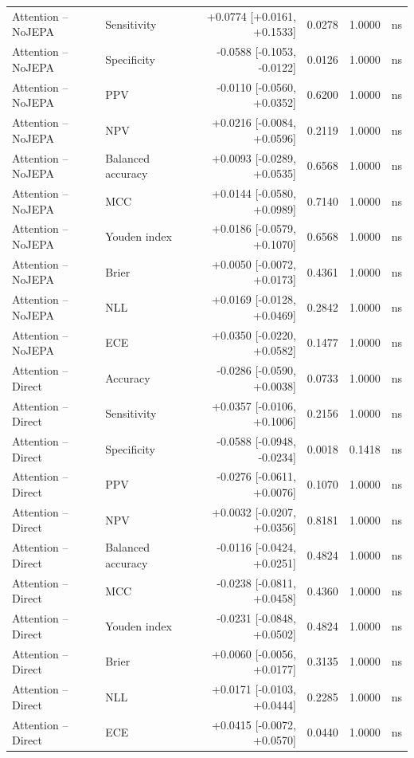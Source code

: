 \begin{table}[t]
\begin{tabular}{llrrrc}
Attention -- NoJEPA & Sensitivity & +0.0774 [+0.0161, +0.1533] & 0.0278 & 1.0000 & ns \\
Attention -- NoJEPA & Specificity & -0.0588 [-0.1053, -0.0122] & 0.0126 & 1.0000 & ns \\
Attention -- NoJEPA & PPV & -0.0110 [-0.0560, +0.0352] & 0.6200 & 1.0000 & ns \\
Attention -- NoJEPA & NPV & +0.0216 [-0.0084, +0.0596] & 0.2119 & 1.0000 & ns \\
Attention -- NoJEPA & Balanced accuracy & +0.0093 [-0.0289, +0.0535] & 0.6568 & 1.0000 & ns \\
Attention -- NoJEPA & MCC & +0.0144 [-0.0580, +0.0989] & 0.7140 & 1.0000 & ns \\
Attention -- NoJEPA & Youden index & +0.0186 [-0.0579, +0.1070] & 0.6568 & 1.0000 & ns \\
Attention -- NoJEPA & Brier & +0.0050 [-0.0072, +0.0173] & 0.4361 & 1.0000 & ns \\
Attention -- NoJEPA & NLL & +0.0169 [-0.0128, +0.0469] & 0.2842 & 1.0000 & ns \\
Attention -- NoJEPA & ECE & +0.0350 [-0.0220, +0.0582] & 0.1477 & 1.0000 & ns \\
Attention -- Direct & Accuracy & -0.0286 [-0.0590, +0.0038] & 0.0733 & 1.0000 & ns \\
Attention -- Direct & Sensitivity & +0.0357 [-0.0106, +0.1006] & 0.2156 & 1.0000 & ns \\
Attention -- Direct & Specificity & -0.0588 [-0.0948, -0.0234] & 0.0018 & 0.1418 & ns \\
Attention -- Direct & PPV & -0.0276 [-0.0611, +0.0076] & 0.1070 & 1.0000 & ns \\
Attention -- Direct & NPV & +0.0032 [-0.0207, +0.0356] & 0.8181 & 1.0000 & ns \\
Attention -- Direct & Balanced accuracy & -0.0116 [-0.0424, +0.0251] & 0.4824 & 1.0000 & ns \\
Attention -- Direct & MCC & -0.0238 [-0.0811, +0.0458] & 0.4360 & 1.0000 & ns \\
Attention -- Direct & Youden index & -0.0231 [-0.0848, +0.0502] & 0.4824 & 1.0000 & ns \\
Attention -- Direct & Brier & +0.0060 [-0.0056, +0.0177] & 0.3135 & 1.0000 & ns \\
Attention -- Direct & NLL & +0.0171 [-0.0103, +0.0444] & 0.2285 & 1.0000 & ns \\
Attention -- Direct & ECE & +0.0415 [-0.0072, +0.0570] & 0.0440 & 1.0000 & ns \\
\bottomrule
\end{tabular}
\end{table}
